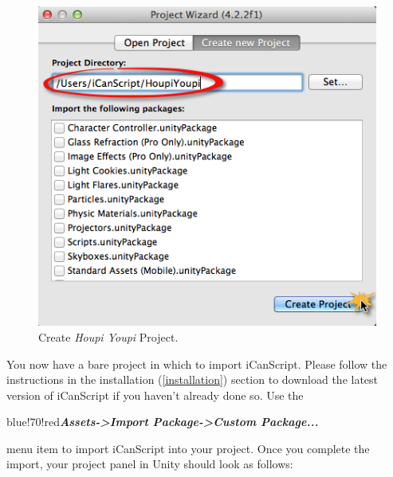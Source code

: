 \begin{figure}[htbp]
\centering
\includegraphics[keepaspectratio,width=\textwidth,height=0.75\textheight]{create-houpi-youpi.png}
\caption{Create \emph{Houpi Youpi} Project.}
\label{create-houpi-youpi.png}
\end{figure}

You now have a bare project in which to import iCanScript. Please follow the instructions in the installation (\autoref{installation}) section to download the latest version of iCanScript if you haven't already done so. Use the \begin{color}{blue!70!red}\emph{\textbf{Assets->Import Package->Custom Package...}}\end{color} menu item to import iCanScript into your project. Once you complete the import, your project panel in Unity should look as follows: 

